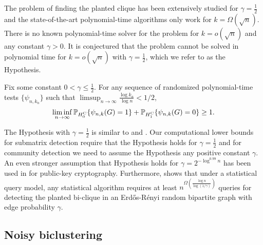 The problem of finding the planted clique has been extensively studied for $\gamma=\frac{1}{2}$ and the state-of-the-art polynomial-time algorithms \cite{Alon98,FR00,McSherry01,Feige10findinghidden,Dekel10,ames2011plantedclique,Deshpande12} only work for $k=\Omega(\sqrt{n})$. There is no known polynomial-time solver for the \PC  problem for $k=o(\sqrt{n})$ and any constant $\gamma>0$. It is conjectured \cite{Jer92,Hazan2011Nash,JP00,AAK07,Feldman13} that the \PC problem cannot be solved in polynomial time for $k=o(\sqrt{n})$ with $\gamma =\frac{1}{2}$, which we refer to as the \PC Hypothesis.
\begin{hypothesis}[\PC Hypothesis]\label{hyp:HypothesisPlantedClique}
Fix some constant $0<\gamma \le \frac{1}{2}$. For any sequence of randomized polynomial-time tests $\{ \psi_{n,k_n} \}$ such that $\limsup_{n \to \infty} \frac{\log k_n }{ \log n} < 1/2$,
\begin{align*}
\liminf_{n \to \infty} \mathbb{P}_{H_0^{\rm C}} \{ \psi_{n,k} (G) =1 \} + \mathbb{P}_{H_1^{\rm C}} \{ \psi_{n,k}(G)=0 \} \ge 1.
\end{align*}
\end{hypothesis}
The \PC Hypothesis with $\gamma=\frac{1}{2}$ is similar to \cite[Hypothesis 1]{ma2013submatrix} and \cite[Hypothesis $\mathbf{B_{PC}}$]{berthet2013lowerSparsePCA}.
Our computational lower bounds for submatrix detection require that the \PC Hypothesis holds for $\gamma=\frac{1}{2}$ and for community detection we need to assume the \PC Hypothesis any positive constant $\gamma$.
An even stronger assumption that \PC Hypothesis holds for $\gamma=2^{-\log^{0.99} n}$ has been used in \cite[Theorem 10.3]{ABW10} for public-key cryptography.
 Furthermore, \cite[Corollary 5.8]{Feldman13} shows that under a statistical query model, any statistical algorithm requires at least $n^{\Omega(\frac{\log n}{ \log (1/\gamma) } ) }$ queries for detecting the planted bi-clique in an Erd\H{o}s-R\'enyi random bipartite graph with edge probability $\gamma$.


	
	\iffalse
	\subsection{Noisy biclustering}
	\label{sec:comp-submat}



